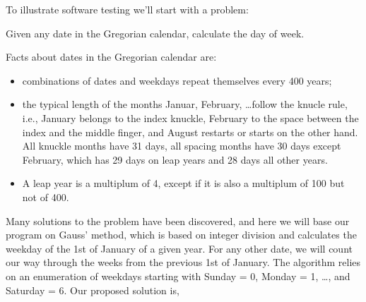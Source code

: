 To illustrate software testing we'll start with a problem:
\begin{problem}
  Given any date in the Gregorian calendar, calculate the day of week.
\end{problem}
Facts about dates in the Gregorian calendar are:
\begin{itemize}
\item combinations of dates and weekdays repeat themselves every 400 years;
\item the typical length of the months Januar, February, \dots follow the knucle rule, i.e., January belongs to the index knuckle, February to the space between the index and the middle finger, and August restarts or starts on the other hand. All knuckle months have 31 days, all spacing months have 30 days except February, which has 29 days on leap years and 28 days all other years.
\item A leap year is a multiplum of 4, except if it is also a multiplum of 100 but not of 400.
\end{itemize}
Many solutions to the problem have been discovered, and here we will base our program on Gauss' method, which is based on integer division and calculates the weekday of the 1st of January of a given year. For any other date, we will count our way through the weeks from the previous 1st of January. The algorithm relies on an enumeration of weekdays starting with Sunday = 0, Monday = 1, \dots, and Saturday = 6. Our proposed solution is,

